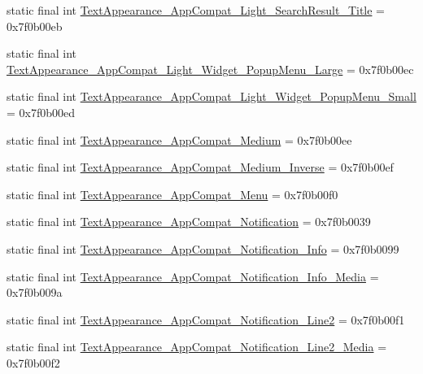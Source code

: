 \begin{CompactItemize}
\item 
static final int \hyperlink{classandroid_1_1support_1_1v7_1_1cardview_1_1_r_1_1style_cf0da66979467cac4e6744ae11d46963}{TextAppearance\_\-AppCompat\_\-Light\_\-SearchResult\_\-Title} = 0x7f0b00eb
\item 
static final int \hyperlink{classandroid_1_1support_1_1v7_1_1cardview_1_1_r_1_1style_29294a57ffea09660144aaa736e02074}{TextAppearance\_\-AppCompat\_\-Light\_\-Widget\_\-PopupMenu\_\-Large} = 0x7f0b00ec
\item 
static final int \hyperlink{classandroid_1_1support_1_1v7_1_1cardview_1_1_r_1_1style_a33fd6dd4430dbf1ccdb08ebcc21d23b}{TextAppearance\_\-AppCompat\_\-Light\_\-Widget\_\-PopupMenu\_\-Small} = 0x7f0b00ed
\item 
static final int \hyperlink{classandroid_1_1support_1_1v7_1_1cardview_1_1_r_1_1style_9cfd90b052c62dcd05369697b3529494}{TextAppearance\_\-AppCompat\_\-Medium} = 0x7f0b00ee
\item 
static final int \hyperlink{classandroid_1_1support_1_1v7_1_1cardview_1_1_r_1_1style_b42cbcf650773a99d20d3a56730f81bf}{TextAppearance\_\-AppCompat\_\-Medium\_\-Inverse} = 0x7f0b00ef
\item 
static final int \hyperlink{classandroid_1_1support_1_1v7_1_1cardview_1_1_r_1_1style_22eede1065dfd7e4488be4cf58f7b8e2}{TextAppearance\_\-AppCompat\_\-Menu} = 0x7f0b00f0
\item 
static final int \hyperlink{classandroid_1_1support_1_1v7_1_1cardview_1_1_r_1_1style_46b4a1725559b07aeaa79cb024fe8edf}{TextAppearance\_\-AppCompat\_\-Notification} = 0x7f0b0039
\item 
static final int \hyperlink{classandroid_1_1support_1_1v7_1_1cardview_1_1_r_1_1style_8ae1dc5902d680722361b19167ecfd77}{TextAppearance\_\-AppCompat\_\-Notification\_\-Info} = 0x7f0b0099
\item 
static final int \hyperlink{classandroid_1_1support_1_1v7_1_1cardview_1_1_r_1_1style_50c83335c67f3792b9347da4062c2a8a}{TextAppearance\_\-AppCompat\_\-Notification\_\-Info\_\-Media} = 0x7f0b009a
\item 
static final int \hyperlink{classandroid_1_1support_1_1v7_1_1cardview_1_1_r_1_1style_9cf36f33e89a96f4e572fdb16acb46b0}{TextAppearance\_\-AppCompat\_\-Notification\_\-Line2} = 0x7f0b00f1
\item 
static final int \hyperlink{classandroid_1_1support_1_1v7_1_1cardview_1_1_r_1_1style_f333d17a46454116279d80563ff14c40}{TextAppearance\_\-AppCompat\_\-Notification\_\-Line2\_\-Media} = 0x7f0b00f2
\item 

\end{CompactItemize}
